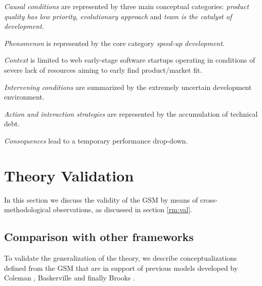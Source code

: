 \documentclass[10pt,journal,letterpaper,compsoc]{IEEEtran}
\begin{document}
\begin{compactitem}

\item \textit{Causal conditions} are represented by three main conceptual
categories: \textit{product quality has low priority}, \textit{evolutionary
approach} and \textit{team is the catalyst of development}. 
\item \textit{Phenomenon} is represented by the core category \textit{speed-up
development}. 
\item \textit{Context} is limited to web early-stage software startups  
operating in conditions of severe lack of resources aiming to early
find  product/market fit. 
\item \textit{Intervening conditions} are  summarized by the extremely  
uncertain development environment. 
\item \textit{Action and interaction strategies} are represented by the  
accumulation of technical debt.
\item \textit{Consequences} lead to a temporary performance drop-down.
\end{compactitem}

\section{Theory Validation} \label{res:val}

In this section we discuss the validity of the GSM by means of 
cross-methodological observations, as discussed in section \ref{rm:val}. 


\subsection{Comparison with other frameworks}
\label{sect:theory:validation:others}

To validate the generalization of the theory, we describe conceptualizations
defined from the GSM that are in support of previous models developed by
Coleman \cite{Coleman2007,Coleman2008a, Coleman2008}, Baskerville
\cite{Internet} and finally Brooks \cite{BrooksJr1987}.
\end{document}
